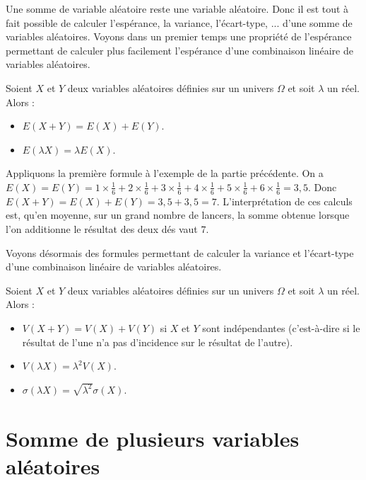 	Une somme de variable aléatoire reste une variable aléatoire. Donc il est tout à fait possible de calculer l'espérance, la variance, l'écart-type, ... d'une somme de variables aléatoires.
	\newpar
	Voyons dans un premier temps une propriété de l'espérance permettant de calculer plus facilement l'espérance d'une combinaison linéaire de variables aléatoires.
	
	\begin{formula}
		Soient $X$ et $Y$ deux variables aléatoires définies sur un univers $\Omega$ et soit $\lambda$ un réel. Alors :
		\begin{itemize}
			\item $E(X + Y) = E(X) + E(Y)$.
			\item $E(\lambda X) = \lambda E(X)$.
		\end{itemize}
	\end{formula}
	
	\begin{tip}[Applications]
		Appliquons la première formule à l'exemple de la partie précédente.
		\newpar
		On a $E(X) = E(Y) = 1 \times \frac{1}{6} + 2 \times \frac{1}{6} + 3 \times \frac{1}{6} + 4 \times \frac{1}{6} + 5 \times \frac{1}{6} + 6 \times \frac{1}{6} = 3,5$.
		\newpar
		Donc $E(X+Y) = E(X) + E(Y) = 3,5 + 3,5 = 7$.
		\newpar
		L'interprétation de ces calculs est, qu'en moyenne, sur un grand nombre de lancers, la somme obtenue lorsque l'on additionne le résultat des deux dés vaut $7$.
	\end{tip}
	
	Voyons désormais des formules permettant de calculer la variance et l'écart-type d'une combinaison linéaire de variables aléatoires.
	
	\begin{formula}
		Soient $X$ et $Y$ deux variables aléatoires définies sur un univers $\Omega$ et soit $\lambda$ un réel. Alors :
		\begin{itemize}
			\item $V(X + Y) = V(X) + V(Y)$ si $X$ et $Y$ sont indépendantes (c'est-à-dire si le résultat de l'une n'a pas d'incidence sur le résultat de l'autre).
			\item $V(\lambda X) = \lambda^2 V(X)$.
			\item $\sigma(\lambda X) = \sqrt{\lambda^2} \sigma(X)$.
		\end{itemize}
	\end{formula}
	
	\section{Somme de plusieurs variables aléatoires}
	
